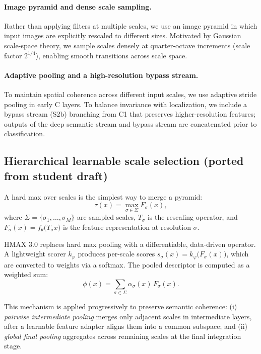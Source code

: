 \documentclass[pdflatex,sn-nature]{sn-jnl}
\begin{document}
\paragraph{Image pyramid and dense scale sampling.}
Rather than applying filters at multiple scales, we use an image pyramid in which input images are
explicitly rescaled to different sizes. Motivated by Gaussian scale-space theory, we sample scales
densely at quarter-octave increments (scale factor $2^{1/4}$), enabling smooth transitions across
scale space.

\paragraph{Adaptive pooling and a high-resolution bypass stream.}
To maintain spatial coherence across different input scales, we use adaptive stride pooling in early
C layers. To balance invariance with localization, we include a bypass stream (S2b) branching from C1
that preserves higher-resolution features; outputs of the deep semantic stream and bypass stream are
concatenated prior to classification.

\subsection{Hierarchical learnable scale selection (ported from student draft)}

A hard max over scales is the simplest way to merge a pyramid:
\begin{equation}
\tau(x)=\max_{\sigma\in\Sigma} F_{\sigma}(x),
\label{eq:maxpool-scale}
\end{equation}
where $\Sigma=\{\sigma_{1},\dots,\sigma_{M}\}$ are sampled scales, $T_{\sigma}$ is the rescaling
operator, and $F_{\sigma}(x)=f_{\theta}\!\bigl(T_{\sigma}x\bigr)$ is the feature representation at
resolution $\sigma$.

HMAX 3.0 replaces hard max pooling with a differentiable, data-driven operator. A lightweight scorer
$k_{\varphi}$ produces per-scale scores $s_{\sigma}(x)=k_{\varphi}\!\bigl(F_{\sigma}(x)\bigr)$, which
are converted to weights via a softmax. The pooled descriptor is computed as a weighted sum:
\begin{equation}
\phi(x)=\sum_{\sigma\in\Sigma}\alpha_{\sigma}(x)\,F_{\sigma}(x).
\label{eq:learnable-scale-pool}
\end{equation}

This mechanism is applied progressively to preserve semantic coherence:
(i) \emph{pairwise intermediate pooling} merges only adjacent scales in intermediate layers, after a
learnable feature adapter aligns them into a common subspace; and (ii) \emph{global final pooling}
aggregates across remaining scales at the final integration stage.
\end{document}

